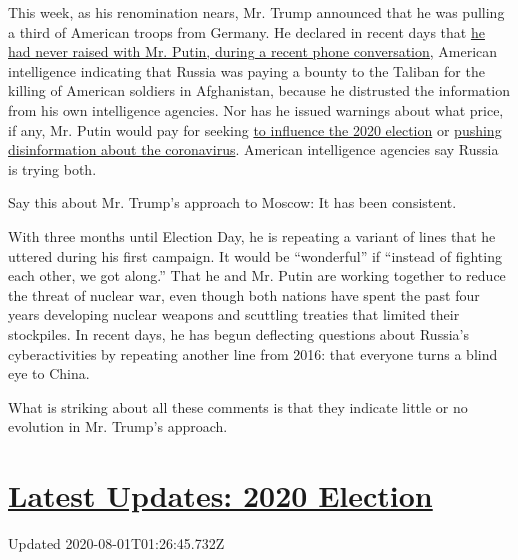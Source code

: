 This week, as his renomination nears, Mr. Trump announced that he was
pulling a third of American troops from Germany. He declared in recent
days that
\href{https://www.axios.com/trump-russia-bounties-taliban-putin-call-4a0f6110-ab58-41c0-96fc-57b507462af1.html}{he
had never raised with Mr. Putin, during a recent phone conversation,}
American intelligence indicating that Russia was paying a bounty to the
Taliban for the killing of American soldiers in Afghanistan, because he
distrusted the information from his own intelligence agencies. Nor has
he issued warnings about what price, if any, Mr. Putin would pay for
seeking
\href{https://www.nytimes.com/2020/07/24/us/politics/election-interference-russia-china-iran.html}{to
influence the 2020 election} or
\href{https://www.nytimes.com/2020/07/28/us/politics/russia-disinformation-coronavirus.html}{pushing
disinformation about the coronavirus}. American intelligence agencies
say Russia is trying both.

Say this about Mr. Trump's approach to Moscow: It has been consistent.

With three months until Election Day, he is repeating a variant of lines
that he uttered during his first campaign. It would be ``wonderful'' if
``instead of fighting each other, we got along.'' That he and Mr. Putin
are working together to reduce the threat of nuclear war, even though
both nations have spent the past four years developing nuclear weapons
and scuttling treaties that limited their stockpiles. In recent days, he
has begun deflecting questions about Russia's cyberactivities by
repeating another line from 2016: that everyone turns a blind eye to
China.

What is striking about all these comments is that they indicate little
or no evolution in Mr. Trump's approach.

\hypertarget{latest-updates-2020-election}{%
\section{\texorpdfstring{\href{https://www.nytimes.com/2020/07/31/us/elections/biden-vs-trump.html?action=click\&pgtype=Article\&state=default\&region=MAIN_CONTENT_1\&context=storylines_live_updates}{Latest
Updates: 2020
Election}}{Latest Updates: 2020 Election}}\label{latest-updates-2020-election}}

Updated 2020-08-01T01:26:45.732Z

